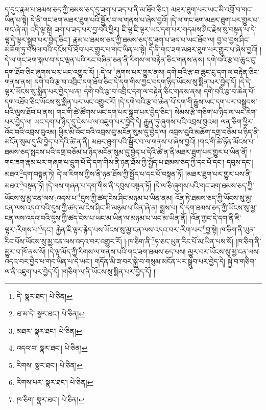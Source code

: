 ད་དུང་རྣམ་པ་ཐམས་ཅད་ཀྱི་ཐམས་ཅད་དུ་ཟག་པ་ཟད་པ་ནི་མ་ཐོབ་ཅིང་། མཐར་ཐུག་པར་ཡང་མི་འགྲོ་བ་གང་ཡིན་པ་སྟེ། དེ་ནི་གང་ཟག་མཐར་ཐུག་པའི་སྦྱོར་བ་ལ་གནས་པ་ཞེས་བྱའོ། །དེ་ལ་གང་ཟག་མཐར་ཐུག་པར་གྱུར་པ་གང་ཞེ་ན། འདི་ལྟ་སྟེ། ཟག་པ་ཟད་པར་བྱ་བའི་ཕྱིར། ཇི་ལྟ་ཇི་ལྟར་ཡང་དག་པར་གདམས་ཤིང་རྗེས་སུ་བསྟན་པ་དེ་ལྟ་དེ་ལྟར་སྒྲུབ་པར་བྱེད་ཅིང་། རྣམ་པ་ཐམས་ཅད་ཀྱི་ཐམས་ཅད་དུ་ཟག་པ་ཟད་པ་ཡང་ཐོབ་ལ། བྱ་བ་བྱས་ཤིང་མཆོག་ཏུ་བསིལ་བའི་དངོས་པོ་ཐོབ་པར་གྱུར་པ་གང་ཡིན་པ་སྟེ། དེ་ནི་གང་ཟག་མཐར་ཐུག་པར་གྱུར་པ་ཞེས་བྱའོ། །དེ་ལ་གང་ཟག་སྐལ་བ་དང་ལྡན་པའི་རང་བཞིན་ཅན་ནི་རིགས་ལ་བརྟེན་ཅིང་གནས་ནས། དགེ་བའི་རྩ་བ་ཆུང་ངུ་དག་ཐོབ་ཅིང་ཞུགས་པར་ཡང་འགྱུར་རོ། །:དེ་ལ་\footnote{དེ་  སྣར་ཐང་།  པེ་ཅིན། }ཞུགས་པར་གྱུར་ནས། དགེ་བའི་རྩ་བ་ཆུང་ངུ་དག་ལ་བརྟེན་ཅིང་གནས་ནས། དགེ་བའི་རྩ་བ་འབྲིང་དག་ཐོབ་ཅིང་དེ་དག་གིས་ཀྱང་བདག་ཉིད་ཡོངས་སུ་སྨིན་པར་བྱེད་དོ། །དེ་དེ་ལྟར་ཡོངས་སུ་སྨིན་པར་བྱེད་པ་ན། དགེ་བའི་རྩ་བ་འབྲིང་དག་ལ་བརྟེན་ཅིང་གནས་ནས། དགེ་བའི་རྩ་བ་ཆེན་པོ་དག་འཐོབ་ཅིང་ཡོངས་སུ་སྨིན་པར་ཡང་འགྱུར་རོ། །དེ་དགེ་བའི་རྩ་བ་ཆེན་པོ་དག་གི་རྒྱུས་ཡང་དག་པར་བསྒྲུབས་པའི་ལུས་ཐོབ་པ་ནས། གང་གི་ཚེ་ཚོགས་ཡང་དག་པར་སྒྲུབ་པར་བྱེད་ཅིང་། སེམས་རྩེ་གཅིག་པ་ཉིད་ལ་ཡང་རེག་པར་བྱེད་ལ། ཡང་དག་པ་ཉིད་དུ་ངེས་པ་ལ་འཇུག་པར་བྱེད་དེ། རྒྱུན་ཏུ་ཞུགས་པའི་འབྲས་བུའམ། ལན་ཅིག་ཕྱིར་འོང་བའི་འབྲས་བུའམ། ཕྱིར་མི་འོང་བའི་འབྲས་བུ་མངོན་སུམ་དུ་བྱེད་ལ། འབྲས་བུའི་མཆོག་དགྲ་བཅོམ་པ་ཉིད་ནི་མངོན་སུམ་དུ་མི་བྱེད་པ་དེའི་ཚེ་ན་ནི། མཐར་ཐུག་པའི་སྦྱོར་བ་ལ་གནས་པ་ཞེས་བྱའོ། །གང་གི་ཚེ་ཉོན་མོངས་པ་ཐམས་ཅད་སྤངས་པའི་དགྲ་བཅོམ་པ་ཉིད་མངོན་སུམ་དུ་བྱེད་པ་དེའི་ཚེ་ན་ནི་མཐར་ཐུག་པར་གྱུར་པ་ཡིན་ནོ། །གང་ཟག་རྣམ་པར་གཞག་པ་དྲུག་པོ་དེ་དག་གིས་ནི་ཉན་ཐོས་ཀྱི་སྤྱོད་པ་ཐམས་ཅད་ཀྱི་དང་པོ་དང་། དབུས་དང་། མཐའ་\footnote{ཐ་མ་དེ་  སྣར་ཐང་།  པེ་ཅིན། }དག་བསྟན་ཏེ། དེ་ལ་རིགས་ཀྱིས་ནི་ཉན་ཐོས་ཀྱི་སྤྱོད་པ་དང་པོ་བསྟན་ཏོ། །མཐར་ཐུག་པར་གྱུར་པས་ནི་མཐའ་\footnote{མཐར་  སྣར་ཐང་།  པེ་ཅིན། }བསྟན་ཏོ། །དེ་ལས་གཞན་པ་དག་གིས་ནི་དབུས་བསྟན་ཏོ། །དེ་ལ་ཅི་ཞུགས་པའི་གང་ཟག་ཐམས་ཅད་ཀྱི་ཡོངས་སུ་མྱ་ངན་ལས་:འདས་པ་\footnote{འདའ་བ་  སྣར་ཐང་།  པེ་ཅིན། }དུས་ཀྱི་ཚད་ངེས་ཤིང་མཉམ་པ་ཡིན་ནམ། འོན་ཏེ་ཐམས་ཅད་ཀྱི་ཡོངས་སུ་མྱ་ངན་ལས་འདའ་བའི་དུས་ཀྱི་ཚད་མ་ངེས་ཤིང་མི་མཉམ་པ་ཡིན་ཞེ་ན། སྨྲས་པ། དེ་དག་ཐམས་ཅད་ཀྱི་ཡོངས་སུ་མྱ་ངན་ལས་འདའ་བའི་དུས་ཀྱི་ཚད་ངེས་པ་ཡང་མ་ཡིན་ལ་མཉམ་པ་ཡང་མ་ཡིན་ནོ། །འོན་ཀྱང་དེ་དག་ནི་ཇི་ལྟར་:རིགས་པ་\footnote{རིགས་  སྣར་ཐང་།  པེ་ཅིན། }དང་། རྐྱེན་ཇི་ལྟར་རྙེད་པས་ཡོངས་སུ་མྱ་ངན་ལས་འདའ་བར་:རིག་པར་\footnote{རིགས་པར་  སྣར་ཐང་།  པེ་ཅིན། }བྱ་སྟེ། ཁ་ཅིག་ནི་ཡུན་རིང་པོས་ཡོངས་སུ་མྱ་ངན་ལས་འདའ་བར་འགྱུར་རོ། །:ཁ་ཅིག་ནི་\footnote{ཁ་ཅིག་  སྣར་ཐང་།  པེ་ཅིན། }ཧ་ཅང་ཡུན་རིང་པོ་མ་ཡིན་པས་སོ། །ཁ་ཅིག་ནི་མྱུར་བ་ཁོ་ནས་སོ། །དེ་ལྟ་མོད་ཀྱི་རིགས་ལ་གནས་པའི་གང་ཟག་ཐམས་ཅད་པས། མྱུར་བར་ཡོངས་སུ་མྱ་ངན་ལས་འདའ་བར་བྱེད་པ་གང་ཡིན་པ་དེ་ཡང་། གདོན་མི་ཟ་བར་སྐྱེ་བ་གསུམ་མངོན་པར་སྒྲུབ་པར་བྱེད་དེ། སྐྱེ་བ་གཅིག་ལ་ནི་འཇུག་པར་བྱེད་དོ། །གཅིག་ལ་ནི་ཡོངས་སུ་སྨིན་པར་བྱེད་དོ། །

